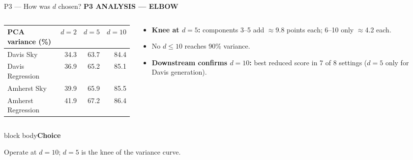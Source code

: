 \documentclass[aspectratio=169,11pt]{beamer}
\newcommand{\sectiontag}[1]{{\footnotesize\usebeamercolor[fg]{structure}\textbf{#1}}\par\vspace{0.10cm}}
\newcommand{\factbox}[2]{\begin{beamercolorbox}[sep=0.13cm,wd=\linewidth]{block body}{\bfseries #1}\par\small #2\end{beamercolorbox}}
\begin{document}
\begin{frame}{P3 — How was $d$ chosen?}
\sectiontag{P3 \quad ANALYSIS — ELBOW}
\begin{columns}[T,totalwidth=\textwidth]
\begin{column}{0.46\textwidth}
{\small\renewcommand{\arraystretch}{1.3}
\begin{tabular}{@{}lrrr@{}}\toprule
\textbf{PCA variance (\%)} & $d{=}2$ & $d{=}5$ & $d{=}10$\\\midrule
Davis Sky & 34.3 & 63.7 & 84.4\\
Davis Regression & 36.9 & 65.2 & 85.1\\
Amherst Sky & 39.9 & 65.9 & 85.5\\
Amherst Regression & 41.9 & 67.2 & 86.4\\
\bottomrule\end{tabular}}
\end{column}
\begin{column}{0.50\textwidth}
\begin{itemize}\setlength\itemsep{0.35em}\small
\item \textbf{Knee at $d=5$:} components 3--5 add $\approx$9.8 points each; 6--10 only $\approx$4.2 each.
\item No $d\le10$ reaches 90\% variance.
\item \textbf{Downstream confirms $d=10$:} best reduced score in 7 of 8 settings ($d=5$ only for Davis generation).
\end{itemize}
\end{column}
\end{columns}
\vspace{0.2cm}
\factbox{Choice}{Operate at $d=10$; $d=5$ is the knee of the variance curve.}
\end{frame}
\end{document}

